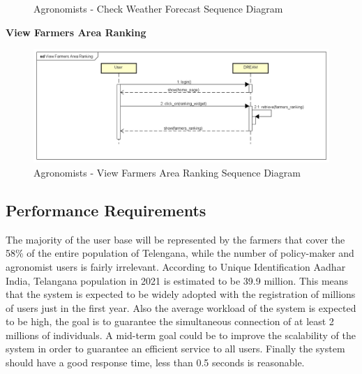 \documentclass[table, 12pt]{article}
\begin{document}
\begin{itemize}
\begin{center}
\begin{figure}[H]
                    \caption{Agronomists - Check Weather Forecast Sequence Diagram}
                    \label{fig: sdAgronomist_checkWeatherForecast}
                \end{figure}
            \end{center}
            \newpage
            \textbf{View Farmers Area Ranking}\\
            \begin{center}
                \begin{figure}[H]
                    \includegraphics[scale=0.60, center]{assets/Sequence diagrams/Agronomist/View Farmers Area Ranking.png}
                    \caption{Agronomists - View Farmers Area Ranking Sequence Diagram}
                    \label{fig: sdAgronomist_viewFarmersAreaRanking}
                \end{figure}
            \end{center}
        \end{itemize}
        \newpage


\subsection{Performance Requirements}
The majority of the user base will be represented by the farmers that cover the 58\% \cite{specification} of the entire population of Telengana, while the number of policy-maker and agronomist users is fairly irrelevant.
According to Unique Identification Aadhar India, Telangana population in 2021 is estimated to be 39.9 million\cite{population}.
This means that the system is expected to be widely adopted with the registration of millions of users just in the first year.
Also the average workload of the system is expected to be high, the goal is to guarantee the simultaneous connection of at least 2 millions of individuals.
A mid-term goal could be to improve the scalability of the system in order to guarantee an efficient service to all users.
Finally the system should have a good response time, less than 0.5 seconds is reasonable.
\end{document}
